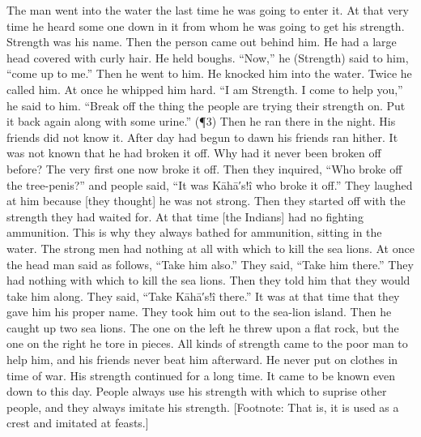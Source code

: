 The man went into the water the last time he was going to enter it.
At that very time he heard some one down in it from whom he was going to get his strength.
Strength was his name.
Then the person came out behind him.
He had a large head covered with curly hair.
He held boughs.
\qqk{}“Now,” he (Strength) said to him, \qqk{}“come up to me.” Then he went to him.
He knocked him into the water.
Twice he called him.
At once he whipped him hard.
\qqk{}“I am Strength.
I come to help you,” he said to him.
\qqk{}“Break off the thing the people are trying their strength on.
Put it back again along with some urine.” (¶3) Then he ran there in the night.
His friends did not know it.
After day had begun to dawn his friends ran hither.
It was not known that he had broken it off.
Why had it never been broken off before?
The very first one now broke it off.
Then they inquired, \qqk{}“Who broke off the tree-penis?” and people said, \qqk{}“It was Kāhā′s!î who broke it off.” They laughed at him because [they thought] he was not strong.
Then they started off with the strength they had waited for.
At that time [the Indians] had no fighting ammunition.
This is why they always bathed for ammunition, sitting in the water.
The strong men had nothing at all with which to kill the sea lions.
At once the head man said as follows, “Take him also.” They said, “Take him there.” They had nothing with which to kill the sea lions.
Then they told him that they would take him along.
They said, \qqk{}“Take Kāhā′s!î there.” It was at that time that they gave him his proper name.
They took him out to the sea-lion island.
Then he caught up two sea lions.
The one on the left he threw upon a flat rock, but the one on the right he tore in pieces.
All kinds of strength came to the poor man to help him, and his friends never beat him afterward.
He never put on clothes in time of war.
His strength continued for a long time.
It came to be known even down to this day.
People always use his strength with which to suprise other people, and they always imitate his strength. [Footnote: That is, it is used as a crest and imitated at feasts.]

